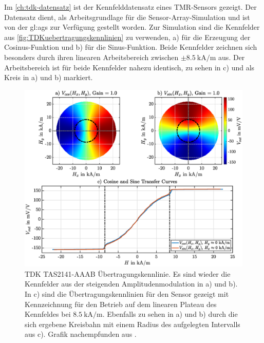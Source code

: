 \clearpage


Im \autoref{ch:tdk-datensatz} ist der Kennfelddatensatz eines TMR-Sensors \cite{TDK2016} gezeigt. Der Datensatz dient, als Arbeitsgrundlage für die Sensor-Array-Simulation und ist von der \gls{gl:ags} zur Verfügung gestellt worden. Zur Simulation sind die Kennfelder aus \autoref{fig:TDKuebertragungskennlinien} zu verwenden, a) für die Erzeugung der Cosinus-Funktion und b) für die Sinus-Funktion. Beide Kennfelder zeichnen sich besonders durch ihren linearen Arbeitsbereich zwischen $\pm\SI{8,5}{\kilo\ampere\per\metre}$ aus. Der Arbeitsbereich ist für beide Kennfelder nahezu identisch, zu sehen in c) und als Kreis in a) und b) markiert. 


\vspace{5mm}
\begin{figure}[tbph]
	\centering
	\includegraphics[width=.95\linewidth]{chapters/images/2-Grundlagen/TDK_Uebertragungskennlinien}
	\caption[TDK TAS2141-AAAB Übertragungskennlinie]{TDK TAS2141-AAAB Übertragungskennlinie. Es sind wieder die 
		Kennfelder aus der steigenden Amplitudenmodulation in a) und b). In c) sind die Übertragungskennlinien für den 
		Sensor gezeigt mit Kennzeichnung für den Betrieb auf dem linearen Plateau des Kennfeldes bei 
		$\SI{8.5}{\kilo\ampere\per\metre}$. Ebenfalls zu sehen in a) und b) durch die sich ergebene Kreisbahn mit einem 
		Radius des aufgelegten Intervalls aus c). Grafik nachempfunden aus \cite{Schuethe2019}.}
	\label{fig:TDKuebertragungskennlinien}
\end{figure}


\clearpage


